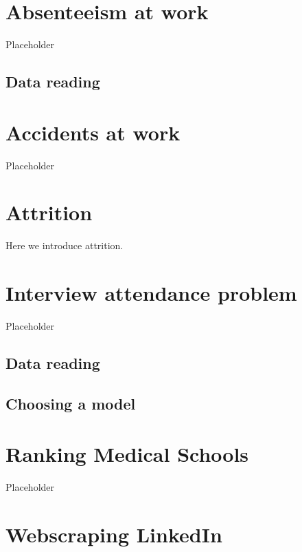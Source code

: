 \documentclass[
  12pt, krantz2,
]{krantz}
\begin{document}
\hypertarget{absenteeism-work}{%
\chapter{Absenteeism at work}\label{absenteeism-work}}

Placeholder

\hypertarget{data-reading}{%
\section{Data reading}\label{data-reading}}

\hypertarget{accidents-work}{%
\chapter{Accidents at work}\label{accidents-work}}

Placeholder

\hypertarget{attrition}{%
\chapter{Attrition}\label{attrition}}

Here we introduce attrition.

\hypertarget{interview-attendance}{%
\chapter{Interview attendance problem}\label{interview-attendance}}

Placeholder

\hypertarget{data-reading-1}{%
\section{Data reading}\label{data-reading-1}}

\hypertarget{choosing-a-model}{%
\section{Choosing a model}\label{choosing-a-model}}

\hypertarget{ranking-medical-school}{%
\chapter{Ranking Medical Schools}\label{ranking-medical-school}}

Placeholder

\hypertarget{webscraping-linkedin}{%
\chapter{Webscraping LinkedIn}\label{webscraping-linkedin}}
\end{document}
